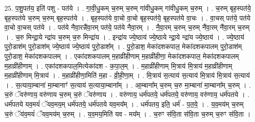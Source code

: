 \documentclass[17pt]{extarticle}
\begin{document}
25. प॒शु॒पत॑य॒ इति॑ पशु - पत॑ये । . गा॒वी॒धु॒कम् च॒रुम् च॒रुम् गा॑वीधु॒कम् गा॑वीधु॒कम् च॒रुम् । . च॒रुम् बृह॒स्पत॑ये॒ बृह॒स्पत॑ये च॒रुम् च॒रुम् बृह॒स्पत॑ये । . बृह॒स्पत॑ये वा॒चो वा॒चो बृह॒स्पत॑ये॒ बृह॒स्पत॑ये वा॒चः । . वा॒चस् पत॑ये॒ पत॑ये वा॒चो वा॒चस् पत॑ये । . पत॑ये नैवा॒रन्नै॑वा॒रम् पत॑ये॒ पत॑ये नैवा॒रम् । . नै॒वा॒रम् च॒रुम् च॒रुम् नै॑वा॒रम् नै॑वा॒रम् च॒रुम् । . च॒रु मिन्द्रा॒ये न्द्रा॑य च॒रुम् च॒रु मिन्द्रा॑य । . इन्द्रा॑य ज्ये॒ष्ठाय॑ ज्ये॒ष्ठाये न्द्रा॒ये न्द्रा॑य ज्ये॒ष्ठाय॑ । . ज्ये॒ष्ठाय॑ पुरो॒डाश॑म् पुरो॒डाश॑म् ज्ये॒ष्ठाय॑ ज्ये॒ष्ठाय॑ पुरो॒डाश᳚म् । . पु॒रो॒डाश॒ मेका॑दशकपाल॒ मेका॑दशकपालम् पुरो॒डाश॑म् पुरो॒डाश॒ मेका॑दशकपालम् । . एका॑दशकपालम् म॒हाव्री॑हीणाम् म॒हाव्री॑हीणा॒ मेका॑दशकपाल॒ मेका॑दशकपालम् म॒हाव्री॑हीणाम् । . एका॑दशकपाल॒मित्येका॑दश - क॒पा॒ल॒म् । . म॒हाव्री॑हीणाम् मि॒त्राय॑ मि॒त्राय॑ म॒हाव्री॑हीणाम् म॒हाव्री॑हीणाम् मि॒त्राय॑ । . म॒हाव्री॑हीणा॒मिति॑ म॒हा - व्री॒ही॒णा॒म् । . मि॒त्राय॑ स॒त्याय॑ स॒त्याय॑ मि॒त्राय॑ मि॒त्राय॑ स॒त्याय॑ । . स॒त्याया॒म्बाना॑ मा॒म्बानाꣳ॑ स॒त्याय॑ स॒त्याया॒म्बाना᳚म् । . आ॒म्बाना᳚म् च॒रुम् च॒रु मा॒म्बाना॑ मा॒म्बाना᳚म् च॒रुम् । . च॒रुं ॅवरु॑णाय॒ वरु॑णाय च॒रुम् च॒रुं ॅवरु॑णाय । . वरु॑णाय॒ धर्म॑पतये॒ धर्म॑पतये॒ वरु॑णाय॒ वरु॑णाय॒ धर्म॑पतये । . धर्म॑पतये यव॒मयं॑ ॅयव॒मय॒म् धर्म॑पतये॒ धर्म॑पतये यव॒मय᳚म् । . धर्म॑पतय॒ इति॒ धर्म॑ - प॒त॒ये॒ । . य॒व॒मय॑म् च॒रुम् च॒रुं ॅय॑व॒मयं॑ ॅयव॒मय॑म् च॒रुम् । . य॒व॒मय॒मिति॑ यव - मय᳚म् । . च॒रुꣳ स॑वि॒ता स॑वि॒ता च॒रुम् च॒रुꣳ स॑वि॒ता । \newline
\end{document}

